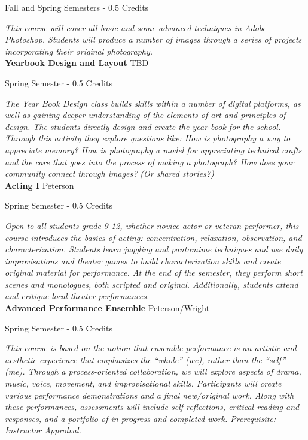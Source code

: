 \noindent Fall and Spring Semesters - 0.5 Credits

\vspace{1mm}\emph{This course will cover all basic and some advanced techniques in Adobe Photoshop. Students will produce a number of images through a series of projects incorporating their original photography.}\\


\noindent\textbf{Yearbook Design and Layout} \hfill TBD

\noindent Spring Semester - 0.5 Credits

\vspace{1mm}\emph{The Year Book Design class builds skills within a number of digital platforms, as well as gaining deeper understanding of the elements of art and principles of design. The students directly design and create the year book for the school. Through this activity they explore questions like: How is photography a way to appreciate memory? How is photography a model for appreciating technical crafts and the care that goes into the process of making a photograph? How does your community connect through images? (Or shared stories?)}\\


\noindent\textbf{Acting I} \hfill Peterson

\noindent Spring Semester - 0.5 Credits

\vspace{1mm}\emph{Open to all students grade 9-12, whether novice actor or veteran performer, this course introduces the basics of acting: concentration, relaxation, observation, and characterization. Students learn juggling and pantomime techniques and use daily improvisations and theater games to build characterization skills and create original material for performance. At the end of the semester, they perform short scenes and monologues, both scripted and original. Additionally, students attend and critique local theater performances.}\\


\noindent\textbf{Advanced Performance Ensemble} \hfill Peterson/Wright

\noindent Spring Semester - 0.5 Credits

\vspace{1mm}\emph{This course is based on the notion that ensemble performance is an artistic and aesthetic experience that emphasizes the “whole” (we), rather than the “self” (me). Through a process-oriented collaboration, we will explore aspects of drama, music, voice, movement, and improvisational skills. Participants will create various performance demonstrations and a final new/original work. Along with these performances, assessments will include self-reflections, critical reading and responses, and a portfolio of in-progress and completed work. Prerequisite: Instructor Approlval.}\\


